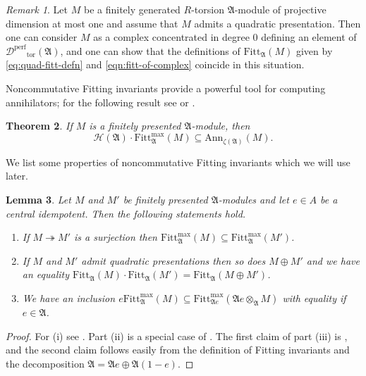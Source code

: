 \documentclass[12pt]{amsart}
\theoremstyle{plain}
\newtheorem{theorem}{Theorem}[section]
\newtheorem{lemma}[theorem]{Lemma}
\theoremstyle{remark}
\newtheorem{remark}[theorem]{Remark}
\theoremstyle{definition}
\numberwithin{equation}{section}
\begin{document}
\begin{remark}\label{rmk:quad-complex-defns-coincide}
Let $M$ be a finitely generated $R$-torsion $\mathfrak{A}$-module of projective dimension at most one 
and assume that $M$ admits a quadratic presentation. 
Then one can consider $M$ as a complex concentrated in degree $0$ defining an element of 
$\mathcal{D}^{\mathrm{perf}}{_{\mathrm{tor}}}(\mathfrak{A})$, and one can show that the definitions of ${\mathrm{Fitt}}_{\mathfrak{A}}(M)$
given by \eqref{eq:quad-fitt-defn} and \eqref{eqn:fitt-of-complex} coincide in this situation. 
\end{remark}

Noncommutative Fitting invariants provide a powerful tool for computing annihilators; for the following result
see \cite[Theorem 3.3]{MR3092262} or \cite[Theorem 4.2]{MR2609173}.

\begin{theorem}\label{thm:Fitt-annihilation}
If $M$ is a finitely presented $\mathfrak{A}$-module, then
\[
\mathcal{H}(\mathfrak{A}) \cdot {\mathrm{Fitt}}_{\mathfrak{A}}^{\max}(M) \subseteq {\mathrm{Ann}}_{\zeta(\mathfrak{A})}(M).
\]
\end{theorem}

We list some properties of noncommutative Fitting invariants which we will use later.

\begin{lemma}\label{lem:Fitting-properties}
Let $M$ and $M'$ be finitely presented $\mathfrak{A}$-modules and let $e \in A$ be a central idempotent.
Then the following statements hold.
\begin{enumerate}
\item
If $M \twoheadrightarrow M'$ is a surjection then ${\mathrm{Fitt}}_{\mathfrak{A}}^{\max}(M) \subseteq {\mathrm{Fitt}}_{\mathfrak{A}}^{\max}(M')$.
\item 
If $M$ and $M'$ admit quadratic presentations then so does $M \oplus M'$ and we have an equality
$
{\mathrm{Fitt}}_{\mathfrak{A}}(M) \cdot {\mathrm{Fitt}}_{\mathfrak{A}}(M') =  {\mathrm{Fitt}}_{\mathfrak{A}}(M \oplus M')
$.
\item
We have an inclusion $e {\mathrm{Fitt}}_{\mathfrak{A}}^{\max}(M) \subseteq {\mathrm{Fitt}}_{\mathfrak{A} e}^{\max}(\mathfrak{A} e \otimes_{\mathfrak{A}} M)$
with equality if $e \in \mathfrak{A}$.
\end{enumerate}
\end{lemma}

\begin{proof}
For (i) see \cite[Theorem 3.1 (i)]{MR3092262}.
Part (ii) is a special case of \cite[Theorem 3.1 (iii)]{MR3092262}.
The first claim of part (iii) is \cite[Theorem 3.1 (vi)]{MR3092262}, and the second claim follows easily from the definition of Fitting invariants
and the decomposition $\mathfrak{A} = \mathfrak{A} e \oplus \mathfrak{A} (1-e)$.
\end{proof}
\end{document}
